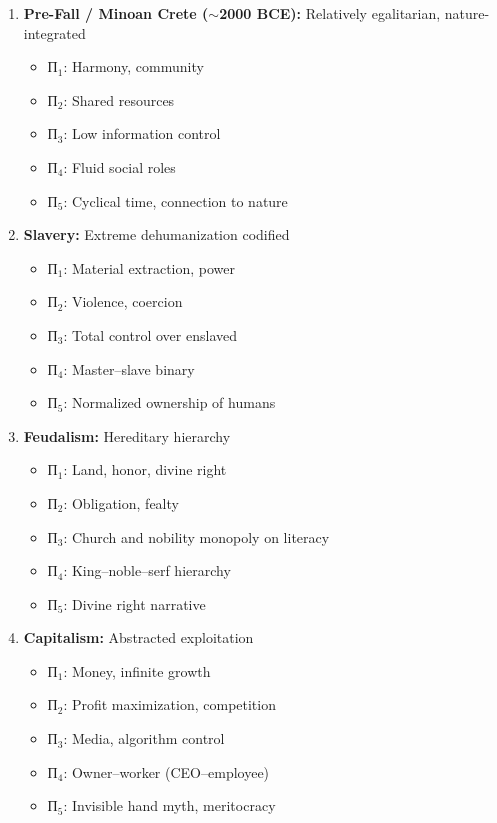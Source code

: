 \documentclass[11pt,a4paper]{article}
\theoremstyle{definition}
\theoremstyle{remark}
\begin{document}
\begin{enumerate}
    \item \textbf{Pre-Fall / Minoan Crete ($\sim$2000 BCE):} Relatively egalitarian, nature-integrated \cite{minoan_crete}
    \begin{itemize}
        \item П$_1$: Harmony, community
        \item П$_2$: Shared resources
        \item П$_3$: Low information control
        \item П$_4$: Fluid social roles
        \item П$_5$: Cyclical time, connection to nature
    \end{itemize}
    
    \item \textbf{Slavery:} Extreme dehumanization codified
    \begin{itemize}
        \item П$_1$: Material extraction, power
        \item П$_2$: Violence, coercion
        \item П$_3$: Total control over enslaved
        \item П$_4$: Master--slave binary
        \item П$_5$: Normalized ownership of humans
    \end{itemize}
    
    \item \textbf{Feudalism:} Hereditary hierarchy
    \begin{itemize}
        \item П$_1$: Land, honor, divine right
        \item П$_2$: Obligation, fealty
        \item П$_3$: Church and nobility monopoly on literacy
        \item П$_4$: King--noble--serf hierarchy
        \item П$_5$: Divine right narrative
    \end{itemize}
    
    \item \textbf{Capitalism:} Abstracted exploitation
    \begin{itemize}
        \item П$_1$: Money, infinite growth
        \item П$_2$: Profit maximization, competition
        \item П$_3$: Media, algorithm control
        \item П$_4$: Owner--worker (CEO--employee)
        \item П$_5$: Invisible hand myth, meritocracy
    \end{itemize}
    

\end{enumerate}
\end{document}
